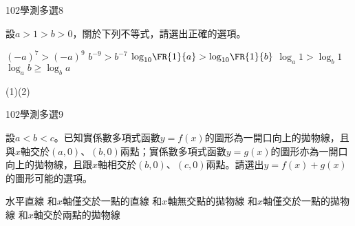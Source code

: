 \begin{QUESTIONS}
\begin{QUESTION}
\begin{QEMPTYSPACE}
        \end{QEMPTYSPACE}
    \end{QUESTION}
    \begin{QUESTION}
        \begin{ExamInfo}{102}{學測}{多選}{8}
        \end{ExamInfo}
        \begin{ExamAnsRateInfo}{47}{68}{50}{23}
        \end{ExamAnsRateInfo}
        \begin{QBODY}
            設$a>1>b>0$，關於下列不等式，請選出正確的選項。
			\begin{QOPS}
				\QOP ${{(-a)}^{7}}>{{(-a)}^{9}}$
				\QOP ${{b}^{-9}}>{{b}^{-7}}$
				\QOP ${{\log }_{10}}\FR{1}{a}>{{\log }_{10}}\FR{1}{b}$
				\QOP ${{\log }_{a}}1>{{\log }_{b}}1$
				\QOP ${{\log }_{a}}b\ge {{\log }_{b}}a$
			\end{QOPS}
        \end{QBODY}
        \begin{QFROMS}
        \end{QFROMS}
        \begin{QTAGS}\end{QTAGS}
        \begin{QANS}
            (1)(2)
        \end{QANS}
        \begin{QSOLLIST}
        \end{QSOLLIST}
        \begin{QEMPTYSPACE}
        \end{QEMPTYSPACE}
    \end{QUESTION}
    \begin{QUESTION}
        \begin{ExamInfo}{102}{學測}{多選}{9}
        \end{ExamInfo}
        \begin{ExamAnsRateInfo}{43}{64}{40}{25}
        \end{ExamAnsRateInfo}
        \begin{QBODY}
            設$a<b<c$。已知實係數多項式函數$y=f(x)$的圖形為一開口向上的拋物線，且與$x$軸交於$(a,0)$、$(b,0)$兩點；實係數多項式函數$y=g(x)$的圖形亦為一開口向上的拋物線，且跟$x$軸相交於$(b,0)$、$(c,0)$兩點。請選出$y=f(x)+g(x)$的圖形可能的選項。
			\begin{QOPS}
				\QOP 水平直線
				\QOP 和$x$軸僅交於一點的直線
				\QOP 和$x$軸無交點的拋物線
				\QOP 和$x$軸僅交於一點的拋物線
				\QOP 和$x$軸交於兩點的拋物線

\end{QOPS}
\end{QBODY}
\end{QUESTION}
\end{QUESTIONS}
